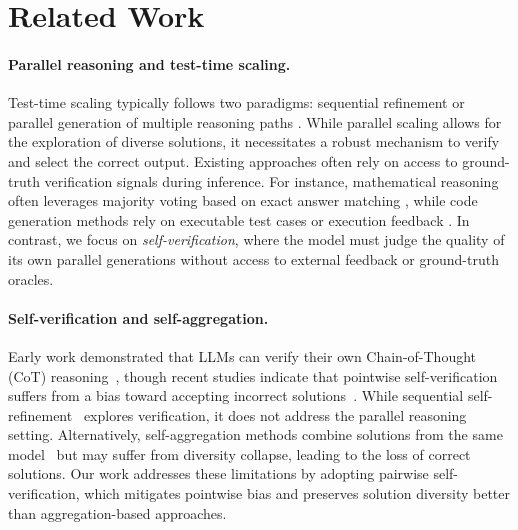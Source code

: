 \section{Related Work}


\paragraph{Parallel reasoning and test-time scaling.} Test-time scaling typically follows two paradigms: sequential refinement \citep{madaan2023selfrefine} or parallel generation of multiple reasoning paths \citep{DBLP:journals/corr/abs-2110-14168, setlur2025scalingtesttimecomputeverification, pan2025learning}. While parallel scaling allows for the exploration of diverse solutions, it necessitates a robust mechanism to verify and select the correct output. Existing approaches often rely on access to ground-truth verification signals during inference. For instance, mathematical reasoning often leverages majority voting based on exact answer matching \citep{wang2023selfconsistency, snell2024scalingllmtesttimecompute}, while code generation methods rely on executable test cases or execution feedback \citep{li2025stesttimescaling, jain2025multiturn}. In contrast, we focus on \textit{self-verification}, where the model must judge the quality of its own parallel generations without access to external feedback or ground-truth oracles.


\paragraph{Self-verification and self-aggregation.} Early work demonstrated that LLMs can verify their own Chain-of-Thought (CoT) reasoning~\citep{weng2023selfverification}, though recent studies indicate that pointwise self-verification suffers from a bias toward accepting incorrect solutions~\citep{lu2025doesverificationpayoff}. While sequential self-refinement~\citep{madaan2023selfrefine, stechly2025on} explores verification, it does not address the parallel reasoning setting. Alternatively, self-aggregation methods combine solutions from the same model~\citep{venkatraman2025recursiveselfaggregationunlocksdeep, madaan2025rethinkingthinkingtokensllms} but may suffer from diversity collapse, leading to the loss of correct solutions. Our work addresses these limitations by adopting pairwise self-verification, which mitigates pointwise bias and preserves solution diversity better than aggregation-based approaches.


